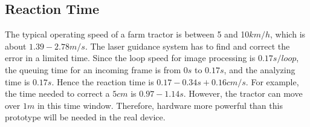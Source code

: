 
\subsection{Reaction Time}

The typical operating speed of a farm tractor is between 5 and 10$km/h$, which is about $1.39-2.78m/s$. The laser guidance system has to find and correct the error in a limited time. Since the loop speed for image processing is $0.17s/loop$, the queuing time for an incoming frame is from $0s$ to $0.17s$, and the analyzing time is $0.17s$. Hence the reaction time is $0.17-0.34s + 0.16cm/s$. For example, the time needed to correct a $5cm$ is $0.97-1.14s$. However, the tractor can move over $1m$ in this time window. Therefore, hardware more powerful than this prototype will be needed in the real device.



